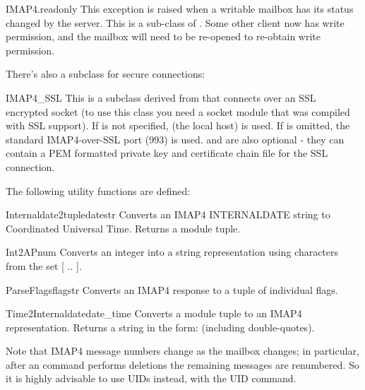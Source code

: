 \begin{excdesc}{IMAP4.readonly}
This exception is raised when a writable mailbox has its status changed by the server.  This is a
sub-class of .  Some other client now has write permission,
and the mailbox will need to be re-opened to re-obtain write permission.
\end{excdesc}

There's also a subclass for secure connections:

\begin{classdesc}{IMAP4_SSL}{}
This is a subclass derived from  that connects over an SSL encrypted socket 
(to use this class you need a socket module that was compiled with SSL support).
If  is not specified,  (the local host) is used.
If  is omitted, the standard IMAP4-over-SSL port (993) is used.
 and  are also optional - they can contain a PEM formatted
private key and certificate chain file for the SSL connection. 
\end{classdesc}

The following utility functions are defined:

\begin{funcdesc}{Internaldate2tuple}{datestr}
  Converts an IMAP4 INTERNALDATE string to Coordinated Universal
  Time. Returns a  module tuple.
\end{funcdesc}

\begin{funcdesc}{Int2AP}{num}
  Converts an integer into a string representation using characters
  from the set [ .. ].
\end{funcdesc}

\begin{funcdesc}{ParseFlags}{flagstr}
  Converts an IMAP4  response to a tuple of individual
  flags.
\end{funcdesc}

\begin{funcdesc}{Time2Internaldate}{date_time}
  Converts a  module tuple to an IMAP4
   representation.  Returns a string in the form:
   (including double-quotes).
\end{funcdesc}


Note that IMAP4 message numbers change as the mailbox changes; in
particular, after an  command performs deletions the
remaining messages are renumbered. So it is highly advisable to use
UIDs instead, with the UID command.

